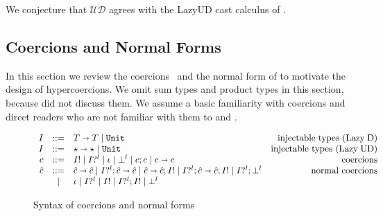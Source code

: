 \documentclass[acmsmall,review,anonymous]{acmart}\settopmatter{printfolios=true,printccs=false,printacmref=false}
\newcommand{\stxrule}[3]{#1 & ::= & #3 & \text{#2}\\}
\newcommand{\stxrulecont}[1]{& | & #1 & \\}
\newcommand{\plus}[0]{+}
\newcommand{\lazyUD}{Lazy\;UD}
\newcommand{\lazyD}{Lazy\;D}
\newcommand{\TOOdyn}[0]{\star}
\newcommand{\POOunit}[0]{\mathtt{Unit}}
\newcommand{\POOfun}[2]{#1 \shortrightarrow #2}
\newcommand{\POOprod}[2]{#1 \times #2}
\newcommand{\POOsum}[2]{#1 \plus #2}
\newcommand{\ncProj}[2]{#1?^{#2}}
\newcommand{\ncInj}[1]{#1!}
\newcommand{\ncId}[0]{\iota}
\newcommand{\ncSeq}[2]{#1;#2}
\newcommand{\ncFail}[1]{\bot^{#1}}
\newcommand{\ncFun}[2]{\POOfun{#1}{#2}}
\newcommand{\ncProd}[2]{\POOprod{#1}{#2}}
\newcommand{\ncSum}[2]{\POOsum{#1}{#2}}
\newcommand{\ineffCEKUD}{$\mathcal{UD}$}
\begin{document}
We conjecture that \ineffCEKUD{} agrees with the \lazyUD{} cast
calculus of \citet{siek2009exploring}.

\subsection{Coercions and Normal Forms} 
\label{sec:coercion-calculus}

In this section we review the
coercions~\citep{henglein1994dynamic,herman2010space} and the normal
form of \citet{siek2012interpretations} to motivate the design of
hypercoercions.  We omit sum types and product types in this section,
because \citet{siek2012interpretations} did not discuss them. We
assume a basic familiarity with coercions and direct readers who are
not familiar with them to \citet{siek2012interpretations} and
\citet{siek2015blame}.

\begin{figure}
  \[
  \begin{array}{rclr}
  \stxrule{I}{injectable types (\lazyD)}{
    \POOfun{T}{T} \mid \POOunit}
  \stxrule{I}{injectable types (\lazyUD)}{
    \POOfun{\TOOdyn}{\TOOdyn} \mid \POOunit
  }
  \stxrule{c}{coercions}{
    \ncInj{I} \mid
    \ncProj{I}{l} \mid
    \ncId \mid
    \ncFail{l} \mid
    \ncSeq{c}{c} \mid
    \ncFun{c}{c}
  }
\stxrule{\hat{c}}{normal coercions}{
  \ncFun{\hat{c}}{\hat{c}} \mid
  \ncSeq{\ncProj{I}{l}}{\ncFun{\hat{c}}{\hat{c}}} \mid
  \ncSeq{\ncFun{\hat{c}}{\hat{c}}}{\ncInj{I}} \mid
  \ncSeq{\ncProj{I}{l}}{\ncSeq{\ncFun{\hat{c}}{\hat{c}}}{\ncInj{I}}} \mid
  \ncSeq{\ncProj{I}{l}}{\ncFail{l}}
}
\stxrulecont{
  \ncId \mid
  \ncProj{I}{l} \mid
  \ncInj{I} \mid
  \ncSeq{\ncProj{I}{l}}{\ncInj{I}} \mid
  \ncFail{l} 
}
  \end{array}
  \]
  \caption{Syntax of coercions and normal forms}
  \label{fig:normal-coercion}
\end{figure}
\end{document}
